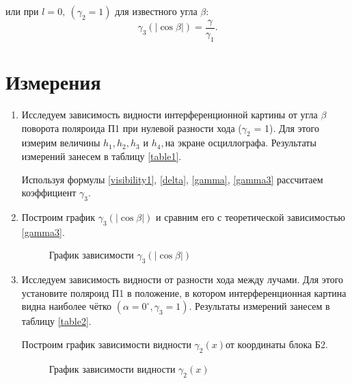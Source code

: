 \documentclass{MagicLabs}
\begin{document}
или при $ l = 0,~(\gamma_2 = 1) $ для известного угла $ \beta $:
\begin{equation}\label{gamma3}
	\gamma_3(|\cos\beta|) = \dfrac{\gamma}{\gamma_1}.
\end{equation}

\section{Измерения}

\begin{enumerate}
	\setcounter{enumi}{0}
	
	\item Исследуем зависимость видности интерференционной картины от угла $ \beta $
	поворота поляроида П1 при нулевой разности хода ($ \gamma_2 $ = 1). Для этого измерим
	величины $ h_1, h_2, h_3 $ и $ h_4, $на экране осциллографа. Результаты измерений занесем
	в таблицу \ref{table1}.
	
	Используя формулы \eqref{visibility1}, \eqref{delta}, \eqref{gamma}, \eqref{gamma3} 
	рассчитаем коэффициент $ \gamma_3 $.

\begin{table}[!h]\centering
	
\end{table}

\item Построим график $ \gamma_3(|\cos\beta|) $ и сравним его с теоретической зависимостью \eqref{gamma3}.

  
\begin{figure}[h!]\centering
	\vspace{-1ex}
	
	\caption{График зависимости $ \gamma_3(|\cos\beta|) $}
\end{figure}

\item Исследуем зависимость видности от разности хода между лучами. Для этого установите поляроид П1 в положение, в котором интерференционная картина видна наиболее чётко 
$ (\alpha=0^\circ, \gamma_3 = 1) $. Результаты измерений занесем
в таблицу \ref{table2}.

\begin{table}[!h]\centering
	
\end{table}

Построим график зависимости видности $ \gamma_2(x)  $от координаты блока Б2.
\newpage

\begin{figure}[h!]\centering
	
	\caption{ График зависимости видности $ \gamma_2(x)  $}
\end{figure}

\end{enumerate}
\end{document}
